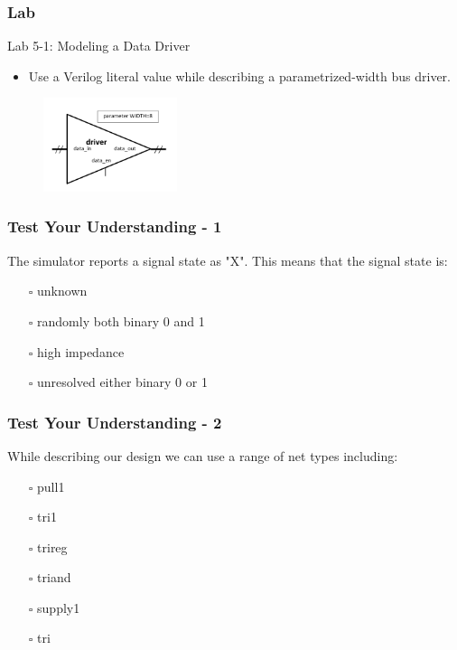 \documentclass[t, notes, xcolor=table]{beamer}
\begin{document}
\begin{frame}
\frametitle{Lab}
Lab 5-1: Modeling a Data Driver
\begin{itemize}
\item Use a Verilog literal value while describing a parametrized-width bus driver.
\end{itemize}

\begin{figure}
    \includegraphics[width=0.35\textwidth]{img/04_lab.png}
\end{figure}
\end{frame}

\begin{frame}
\frametitle{Test Your Understanding - 1}
The simulator reports a signal state as "X". This means that the signal state is:
\begin{itemize}
\item[$\square$] unknown
\item[$\square$] randomly both binary 0 and 1
\item[$\square$] high impedance
\item[$\square$] unresolved either binary 0 or 1
\end{itemize}
\end{frame}



\begin{frame}
\frametitle{Test Your Understanding - 2}
While describing our design we can use a range of net types including:
\begin{itemize}
\item[$\square$] pull1
\item[$\square$] tri1
\item[$\square$] trireg
\item[$\square$] triand
\item[$\square$] supply1
\item[$\square$] tri
\end{itemize}
\end{frame}
\end{document}
